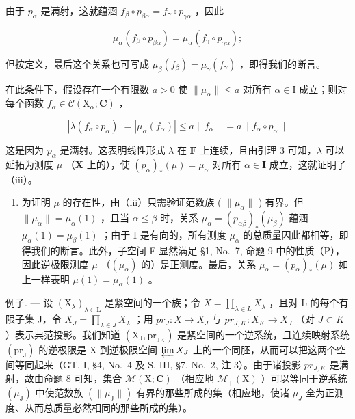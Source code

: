 由于 \(p_{\alpha}\) 是满射，这就蕴涵 \(f_{\beta} \circ p_{\beta \alpha} = f_{\gamma} \circ p_{\gamma \alpha}\) ，因此

\[
\mu_ {\alpha} (f _ {\beta} \circ p _ {\beta \alpha}) = \mu_ {\alpha} (f _ {\gamma} \circ p _ {\gamma \alpha});
\]

但按定义，最后这个关系也可写成 \(\mu_{\beta}(f_{\beta}) = \mu_{\gamma}(f_{\gamma})\) ，即得我们的断言。

在此条件下，假设存在一个有限数 \(a > 0\) 使 \(\| \mu_{\alpha}\| \leqslant a\) 对所有 \(\alpha \in \mathrm{I}\) 成立；则对每个函数 \(f_{\alpha} \in \mathcal{C}(\mathrm{X}_{\alpha};\mathbf{C})\) ，

\[
\left| \lambda (f _ {\alpha} \circ p _ {\alpha}) \right| = \left| \mu_ {\alpha} (f _ {\alpha}) \right| \leqslant a \| f _ {\alpha} \| = a \| f _ {\alpha} \circ p _ {\alpha} \|
\]

这是因为 \(p_{\alpha}\) 是满射。这表明线性形式 \(\lambda\) 在 \(\mathbf{F}\) 上连续，且由引理 3 可知，\(\lambda\) 可以延拓为测度 \(\mu\) （\(\mathbf{X}\) 上的），使 \((p_{\alpha})_{*}(\mu) = \mu_{\alpha}\) 对所有 \(\alpha \in \mathbf{I}\) 成立，这就证明了（iii）。

\begin{enumerate}
\def\labelenumi{(\roman{enumi})}
\setcounter{enumi}{3}
\tightlist
\item
  为证明 \(\mu\) 的存在性，由（iii）只需验证范数族 ( \(\| \mu_{\alpha}\|\) ) 有界。但 \(\| \mu_{\alpha}\| = \mu_{\alpha}(1)\) ，且当 \(\alpha \leqslant \beta\) 时，关系 \(\mu_{\alpha} = (p_{\alpha \beta})_{*}(\mu_{\beta})\) 蕴涵 \(\mu_{\alpha}(1) = \mu_{\beta}(1)\) ；由于 I 是有向的，所有测度 \(\mu_{\alpha}\) 的总质量因此都相等，即得我们的断言。此外，子空间 F 显然满足 §1, No.~7, 命题 9 中的性质（P），因此逆极限测度 \(\mu\) （\((\mu_{\alpha})\) 的）是正测度。最后，关系 \(\mu_{\alpha} = (p_{\alpha})_{*}(\mu)\) 如上一样表明 \(\mu(1) = \mu_{\alpha}(1)\) 。
\end{enumerate}

例子. --- 设 \((\mathrm{X}_{\lambda})_{\lambda\in\mathrm{L}}\) 是紧空间的一个族；令 \(X=\prod_{\lambda\in L}X_{\lambda}\) ，且对 L 的每个有限子集 J，令 \(X_{J}=\prod_{\lambda\in J}X_{\lambda}\) ；用 \(pr_{J}:X\to X_{J}\) 与 \(pr_{J,K}:X_{K}\to X_{J}\) （对 \(J\subset K\) ）表示典范投影。我们知道 \((\mathrm{X}_{\mathrm{J}},\mathrm{pr}_{\mathrm{JK}})\) 是紧空间的一个逆系统，且连续映射系统 \((\mathrm{pr}_{\mathrm{J}})\) 的逆极限是 X 到逆极限空间 \(\varprojlim X_{J}\) 上的一个同胚，从而可以把这两个空间等同起来（GT, I, §4, No.~4 及 S, III, §7, No.~2, 注 3）。由于诸投影 \(pr_{J,K}\) 是满射，故由命题 8 可知，集合 \(\mathcal{M}(\mathrm{X};\mathbf{C})\) （相应地 \(\mathcal{M}_{+}(\mathrm{X})\) ）可以等同于逆系统 \((\mu_{\mathrm{J}})\) 中使范数族 \((\|\mu_{\mathrm{J}}\|)\) 有界的那些所成的集（相应地，使诸 \(\mu_{J}\) 全为正测度、从而总质量必然相同的那些所成的集）。

